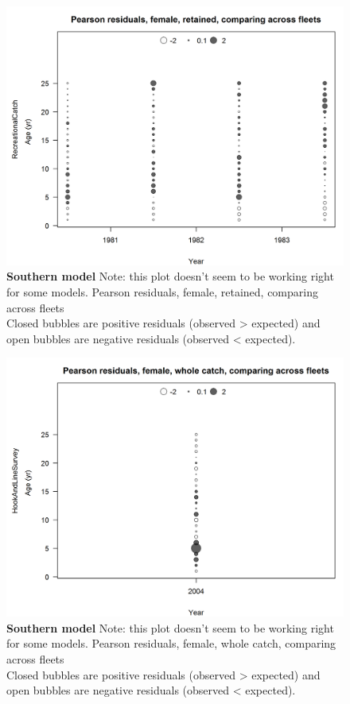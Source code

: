 \documentclass[12pt,]{article}
\begin{document}
\begin{figure}[htbp]
\centering
\includegraphics{./r4ss/plots_mod2/comp_agefit_sex2mkt2_multi-fleet_comparison.png}
\caption{\textbf{Southern model} Note: this plot doesn't seem to be
working right for some models. Pearson residuals, female, retained,
comparing across fleets\\
Closed bubbles are positive residuals (observed \textgreater{} expected)
and open bubbles are negative residuals (observed \textless{} expected).
\label{fig:mod2_10_comp_agefit_sex2mkt2_multi-fleet_comparison}}
\end{figure}

\begin{figure}[htbp]
\centering
\includegraphics{./r4ss/plots_mod2/comp_agefit_sex2mkt0_multi-fleet_comparison.png}
\caption{\textbf{Southern model} Note: this plot doesn't seem to be
working right for some models. Pearson residuals, female, whole catch,
comparing across fleets\\
Closed bubbles are positive residuals (observed \textgreater{} expected)
and open bubbles are negative residuals (observed \textless{} expected).
\label{fig:mod2_11_comp_agefit_sex2mkt0_multi-fleet_comparison}}
\end{figure}
\end{document}
